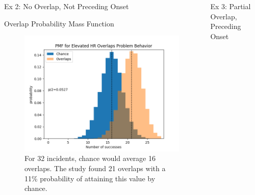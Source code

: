 \documentclass[final]{beamer}
\newlength{\onecolwid}
\newlength{\twocolwid}
\begin{document}
\begin{frame}[t]
\begin{columns}[t]
\begin{column}{\twocolwid}
\begin{columns}[t,totalwidth=\twocolwid]
\begin{column}{\onecolwid}
\begin{block}{Ex 2: No Overlap, Not Preceding Onset}
\end{block}


\begin{block}{Overlap Probability Mass Function}
	
	\begin{figure}
		\includegraphics[width=0.8\linewidth]{Overlaps.png}
		\caption{For 32 incidents, chance would average 16 overlaps. The study found 21 overlaps with a 11\% probability of attaining this value by chance.}
	\end{figure}
	
\end{block}


\end{column} %


\begin{column}{\onecolwid}\vspace{-.6in} %


\begin{block}{Ex 3: Partial Overlap, Preceding Onset}
	

\end{block}
\end{column}
\end{columns}
\end{column}
\end{columns}
\end{frame}
\end{document}
